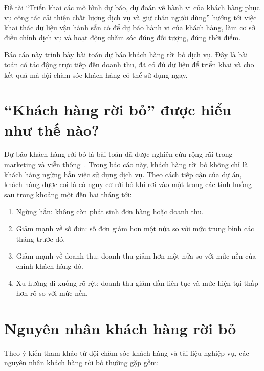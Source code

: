 Đề tài ``Triển khai các mô hình dự báo, dự đoán về hành vi của khách hàng phục vụ công tác cải thiện chất lượng dịch vụ và giữ chân người dùng'' hướng tới việc khai thác dữ liệu vận hành sẵn có để dự báo hành vi của khách hàng, làm cơ sở điều chỉnh dịch vụ và hoạt động chăm sóc đúng đối tượng, đúng thời điểm.

Báo cáo này trình bày bài toán dự báo khách hàng rời bỏ dịch vụ. Đây là bài toán có tác động trực tiếp đến doanh thu, đã có đủ dữ liệu để triển khai và cho kết quả mà đội chăm sóc khách hàng có thể sử dụng ngay.

\section{``Khách hàng rời bỏ'' được hiểu như thế nào?}

Dự báo khách hàng rời bỏ là bài toán đã được nghiên cứu rộng rãi trong marketing và viễn thông~\cite{neslin2006defection}. Trong báo cáo này, khách hàng rời bỏ không chỉ là khách hàng ngừng hẳn việc sử dụng dịch vụ. Theo cách tiếp cận của
dự án, khách hàng được coi là có nguy cơ rời bỏ khi rơi vào một trong các tình huống sau trong khoảng một đến hai tháng tới:

\begin{enumerate}
  \item Ngừng hẳn: không còn phát sinh đơn hàng hoặc doanh thu.
  \item Giảm mạnh về số đơn: số đơn giảm hơn một nửa so với mức trung bình các tháng trước đó.
  \item Giảm mạnh về doanh thu: doanh thu giảm hơn một nửa so với mức nền của chính khách hàng đó.
  \item Xu hướng đi xuống rõ rệt: doanh thu giảm dần liên tục và mức hiện tại thấp hơn rõ so với mức nền.
\end{enumerate}

\section{Nguyên nhân khách hàng rời bỏ}

Theo ý kiến tham khảo từ đội chăm sóc khách hàng và tài liệu nghiệp vụ, các nguyên nhân khách hàng rời bỏ thường gặp gồm:

